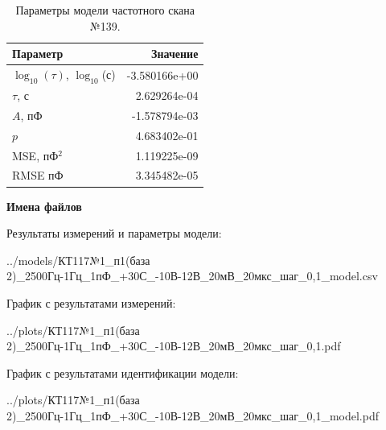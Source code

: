 \begin{table}[!ht]
    \centering
    \caption{Параметры модели частотного скана №139.}
    \begin{tabular}{|l|r|}
        \hline
        Параметр                                       & Значение                  \\ \hline
        $\log_{10}(\tau)$, $\log_{10}$(с)              & -3.580166e+00             \\ \hline
        $\tau$, с                                      & 2.629264e-04              \\ \hline
        $A$, пФ                                        & -1.578794e-03             \\ \hline
        $p$                                            & 4.683402e-01              \\ \hline
        MSE, пФ$^2$                                    & 1.119225e-09              \\ \hline
        RMSE пФ                                        & 3.345482e-05              \\ \hline
    \end{tabular}
    \label{table:frequency_scan_model_139}
\end{table}

\textbf{Имена файлов}

Результаты измерений и параметры модели:

\scriptsize../models/КТ117№1\_п1(база 2)\_2500Гц-1Гц\_1пФ\_+30С\_-10В-12В\_20мВ\_20мкс\_шаг\_0,1\_model.csv
\normalsize

График с результатами измерений:

\scriptsize../plots/КТ117№1\_п1(база 2)\_2500Гц-1Гц\_1пФ\_+30С\_-10В-12В\_20мВ\_20мкс\_шаг\_0,1.pdf
\normalsize

График с результатами идентификации модели:

\scriptsize../plots/КТ117№1\_п1(база 2)\_2500Гц-1Гц\_1пФ\_+30С\_-10В-12В\_20мВ\_20мкс\_шаг\_0,1\_model.pdf
\normalsize

